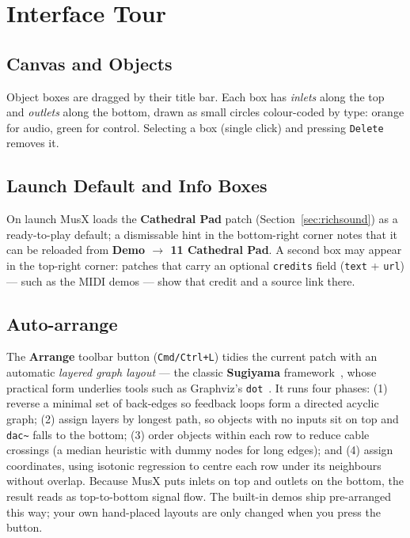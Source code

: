 \documentclass[11pt,letterpaper]{article}
\begin{document}
\section{Interface Tour}
\label{sec:interface}

\subsection{Canvas and Objects}
Object boxes are dragged by their title bar. Each box has \emph{inlets} along the top and
\emph{outlets} along the bottom, drawn as small circles colour-coded by type: orange for
audio, green for control. Selecting a box (single click) and pressing \texttt{Delete}
removes it.

\subsection{Launch Default and Info Boxes}
On launch MusX loads the \textbf{Cathedral Pad} patch (Section~\ref{sec:richsound}) as a
ready-to-play default; a dismissable hint in the bottom-right corner notes that it can be
reloaded from \textbf{Demo $\rightarrow$ 11 Cathedral Pad}. A second box may appear in the
top-right corner: patches that carry an optional \texttt{credits} field (\texttt{text} +
\texttt{url}) --- such as the MIDI demos --- show that credit and a source link there.

\subsection{Auto-arrange}
\label{sec:autolayout}
The \textbf{Arrange} toolbar button (\texttt{Cmd/Ctrl+L}) tidies the current patch with an automatic
\emph{layered graph layout} --- the classic \textbf{Sugiyama} framework~\cite{sugiyama}, whose
practical form underlies tools such as Graphviz's \texttt{dot}~\cite{gansner}. It runs four phases:
(1) reverse a minimal set of back-edges so feedback loops form a directed acyclic graph;
(2) assign layers by longest path, so objects with no inputs sit on top and \texttt{dac\~{}} falls to
the bottom; (3) order objects within each row to reduce cable crossings (a median heuristic with
dummy nodes for long edges); and (4) assign coordinates, using isotonic regression to centre each
row under its neighbours without overlap. Because MusX puts inlets on top and outlets on the
bottom, the result reads as top-to-bottom signal flow. The built-in demos ship pre-arranged this
way; your own hand-placed layouts are only changed when you press the button.
\end{document}

